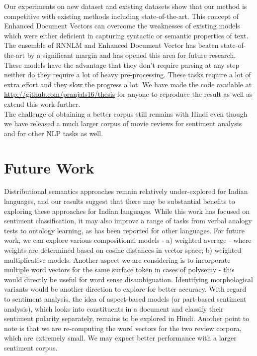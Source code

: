 \documentclass[11pt,a4paper]{article}
\begin{document}
Our experiments on new dataset and existing datasets show that our method is competitive with existing methods including state-of-the-art. This concept of Enhanced Document Vectors can overcome the weaknesses of existing models which were either deficient in capturing syntactic or semantic properties of text. The ensemble of RNNLM and Enhanced Document Vector has beaten state-of-the-art by a significant margin and has opened this area for future research. These models have the advantage that they don't require parsing at any step neither do they require a lot of heavy pre-processing. These tasks require a lot of extra effort and they slow the progress a lot. We have made the code available at \url{http://github.com/pranjals16/thesis} for anyone to reproduce the result as well as extend this work further.\\
The challenge of obtaining a better corpus still remains with Hindi even though we have released a much larger corpus of movie reviews for sentiment analysis and for other NLP tasks as well.

\section{Future Work}
\label{sec:future_work}
Distributional semantics approaches remain relatively under-explored for Indian languages, and our results suggest that there may be substantial benefits to exploring these approaches for Indian languages.  While this work has focused on sentiment classification, it may also improve a range of tasks from verbal analogy tests to ontology learning, as has been reported for other languages.
For future work, we can explore various compositional models - a) weighted average - where weights are determined based on cosine distances in vector space;  b) weighted multiplicative models. Another aspect we are considering is to incorporate multiple word vectors for the same surface token in cases of polysemy - this would directly be useful for word sense disambiguation.  Identifying morphological variants would be another direction to explore for better accuracy. With regard to sentiment analysis, the idea of aspect-based models (or part-based sentiment analysis), which looks into constituents in a document and classify their sentiment polarity separately, remains to be explored in Hindi. Another point to note is that we are re-computing the word vectors for the two review corpora, which are extremely small.  We may expect better performance  with a larger sentiment corpus.
\end{document}
